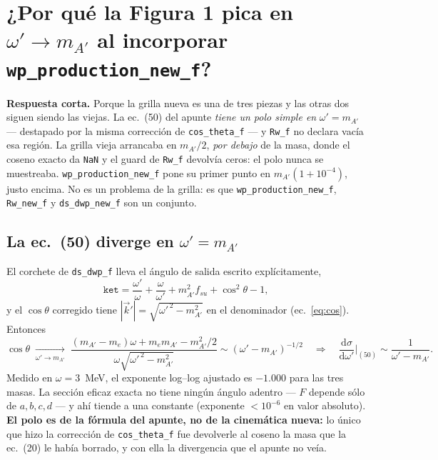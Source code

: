 \documentclass[11pt,a4paper]{article}
\newcommand{\Ap}{A'}
\newcommand{\dd}{\mathrm{d}}
\newcommand{\wpr}{\omega'}
\begin{document}
\section{¿Por qué la Figura 1 pica en \texorpdfstring{$\wpr\to m_{\Ap}$}{w' -> mA'} al incorporar \texttt{wp\_production\_new\_f}?}

\noindent\textbf{Respuesta corta.} Porque la grilla nueva es una de tres piezas y las otras dos siguen siendo las
viejas. La ec.~(50) del apunte \emph{tiene un polo simple en} $\wpr=m_{\Ap}$ --- destapado por la misma corrección de
\texttt{cos\_theta\_f} --- y \texttt{Rw\_f} no declara vacía esa región. La grilla vieja arrancaba en $m_{\Ap}/2$,
\emph{por debajo} de la masa, donde el coseno exacto da \texttt{NaN} y el guard de \texttt{Rw\_f} devolvía ceros: el
polo nunca se muestreaba. \texttt{wp\_production\_new\_f} pone su primer punto en $m_{\Ap}(1+10^{-4})$, justo encima.
No es un problema de la grilla: es que \texttt{wp\_production\_new\_f}, \texttt{Rw\_new\_f} y \texttt{ds\_dwp\_new\_f}
son un conjunto.

\subsection{La ec.~(50) diverge en $\wpr=m_{\Ap}$}
El corchete de \texttt{ds\_dwp\_f} lleva el ángulo de salida escrito explícitamente,
\begin{equation}
\texttt{ket}=\frac{\wpr}{\omega}+\frac{\omega}{\wpr}+m_{\Ap}^2 f_{su}+\cos^2\theta-1 ,
\end{equation}
y el $\cos\theta$ corregido tiene $|\vec k'|=\sqrt{\wpr^{\,2}-m_{\Ap}^2}$ en el denominador (ec.~\eqref{eq:cos}).
Entonces
\begin{equation}
\cos\theta\;\xrightarrow[\wpr\to m_{\Ap}]{}\;\frac{(m_{\Ap}-m_e)\omega+m_e m_{\Ap}-m_{\Ap}^2/2}{\omega\sqrt{\wpr^{\,2}-m_{\Ap}^2}}
\sim(\wpr-m_{\Ap})^{-1/2}
\quad\Longrightarrow\quad
\frac{\dd\sigma}{\dd\wpr}\Big|_{(50)}\sim\frac{1}{\wpr-m_{\Ap}} .
\end{equation}
Medido en $\omega=3$~MeV, el exponente log--log ajustado es $-1.000$ para las tres masas. La sección eficaz exacta no
tiene ningún ángulo adentro --- $F$ depende sólo de $a,b,c,d$ --- y ahí tiende a una constante (exponente $<10^{-6}$
en valor absoluto). \textbf{El polo es de la fórmula del apunte, no de la cinemática nueva:} lo único que hizo la
corrección de \texttt{cos\_theta\_f} fue devolverle al coseno la masa que la ec.~(20) le había borrado, y con ella la
divergencia que el apunte no veía.
\end{document}
